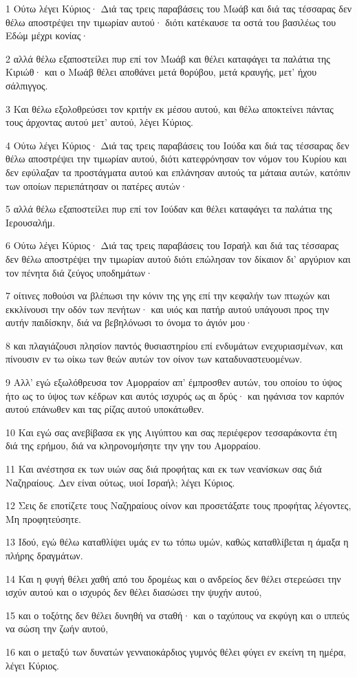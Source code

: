 \par 1 Ούτω λέγει Κύριος· Διά τας τρεις παραβάσεις του Μωάβ και διά τας τέσσαρας δεν θέλω αποστρέψει την τιμωρίαν αυτού· διότι κατέκαυσε τα οστά του βασιλέως του Εδώμ μέχρι κονίας·
\par 2 αλλά θέλω εξαποστείλει πυρ επί τον Μωάβ και θέλει καταφάγει τα παλάτια της Κιριώθ· και ο Μωάβ θέλει αποθάνει μετά θορύβου, μετά κραυγής, μετ' ήχου σάλπιγγος.
\par 3 Και θέλω εξολοθρεύσει τον κριτήν εκ μέσου αυτού, και θέλω αποκτείνει πάντας τους άρχοντας αυτού μετ' αυτού, λέγει Κύριος.
\par 4 Ούτω λέγει Κύριος· Διά τας τρεις παραβάσεις του Ιούδα και διά τας τέσσαρας δεν θέλω αποστρέψει την τιμωρίαν αυτού, διότι κατεφρόνησαν τον νόμον του Κυρίου και δεν εφύλαξαν τα προστάγματα αυτού και επλάνησαν αυτούς τα μάταια αυτών, κατόπιν των οποίων περιεπάτησαν οι πατέρες αυτών·
\par 5 αλλά θέλω εξαποστείλει πυρ επί τον Ιούδαν και θέλει καταφάγει τα παλάτια της Ιερουσαλήμ.
\par 6 Ούτω λέγει Κύριος· Διά τας τρεις παραβάσεις του Ισραήλ και διά τας τέσσαρας δεν θέλω αποστρέψει την τιμωρίαν αυτού διότι επώλησαν τον δίκαιον δι' αργύριον και τον πένητα διά ζεύγος υποδημάτων·
\par 7 οίτινες ποθούσι να βλέπωσι την κόνιν της γης επί την κεφαλήν των πτωχών και εκκλίνουσι την οδόν των πενήτων· και υιός και πατήρ αυτού υπάγουσι προς την αυτήν παιδίσκην, διά να βεβηλόνωσι το όνομα το άγιόν μου·
\par 8 και πλαγιάζουσι πλησίον παντός θυσιαστηρίου επί ενδυμάτων ενεχυριασμένων, και πίνουσιν εν τω οίκω των θεών αυτών τον οίνον των καταδυναστευομένων.
\par 9 Αλλ' εγώ εξωλόθρευσα τον Αμορραίον απ' έμπροσθεν αυτών, του οποίου το ύψος ήτο ως το ύψος των κέδρων και αυτός ισχυρός ως αι δρύς· και ηφάνισα τον καρπόν αυτού επάνωθεν και τας ρίζας αυτού υποκάτωθεν.
\par 10 Και εγώ σας ανεβίβασα εκ γης Αιγύπτου και σας περιέφερον τεσσαράκοντα έτη διά της ερήμου, διά να κληρονομήσητε την γην του Αμορραίου.
\par 11 Και ανέστησα εκ των υιών σας διά προφήτας και εκ των νεανίσκων σας διά Ναζηραίους. Δεν είναι ούτως, υιοί Ισραήλ; λέγει Κύριος.
\par 12 Σεις δε εποτίζετε τους Ναζηραίους οίνον και προσετάξατε τους προφήτας λέγοντες, Μη προφητεύσητε.
\par 13 Ιδού, εγώ θέλω καταθλίψει υμάς εν τω τόπω υμών, καθώς καταθλίβεται η άμαξα η πλήρης δραγμάτων.
\par 14 Και η φυγή θέλει χαθή από του δρομέως και ο ανδρείος δεν θέλει στερεώσει την ισχύν αυτού και ο ισχυρός δεν θέλει διασώσει την ψυχήν αυτού,
\par 15 και ο τοξότης δεν θέλει δυνηθή να σταθή· και ο ταχύπους να εκφύγη και ο ιππεύς να σώση την ζωήν αυτού,
\par 16 και ο μεταξύ των δυνατών γενναιοκάρδιος γυμνός θέλει φύγει εν εκείνη τη ημέρα, λέγει Κύριος.


